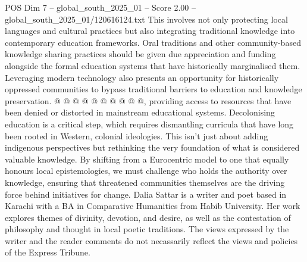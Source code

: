 \begin{textsample}{POS Dim 7 – global\_south\_2025\_01 – Score 2.00 – global\_south\_2025\_01/120616124.txt}
This involves not only protecting local languages and cultural practices but also integrating traditional knowledge into contemporary education frameworks.
Oral traditions and other community-based knowledge sharing practices should be given due appreciation and funding alongside the formal education systems that have historically marginalised them.
Leveraging modern technology also presents an opportunity for historically oppressed communities to bypass traditional barriers to education and knowledge preservation. @ @ @ @ @ @ @ @ @ @, providing access to resources that have been denied or distorted in mainstream educational systems.
Decolonising education is a critical step, which requires dismantling curricula that have long been rooted in Western, colonial ideologies.
This isn't just about adding indigenous perspectives but rethinking the very foundation of what is considered valuable knowledge.
By shifting from a Eurocentric model to one that equally honours local epistemologies, we must challenge who holds the authority over knowledge, ensuring that threatened communities themselves are the driving force behind initiatives for change.
Dalia Sattar is a writer and poet based in Karachi with a BA in Comparative Humanities from Habib University.
Her work explores themes of divinity, devotion, and desire, as well as the contestation of philosophy and thought in local poetic traditions.
The views expressed by the writer and the reader comments do not necassarily reflect the views and policies of the Express Tribune.

\end{textsample}
